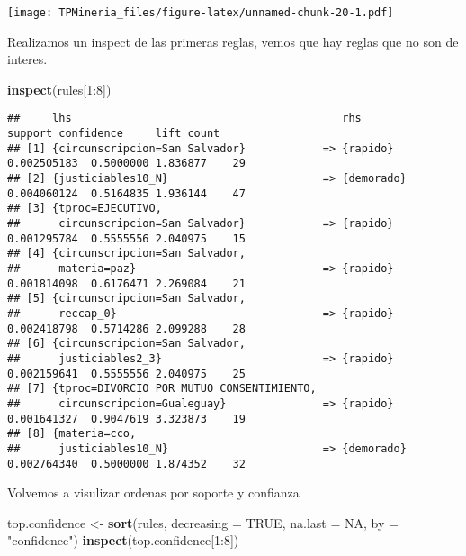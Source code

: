 \documentclass[runningheads,a4paper]{llncs}
\newenvironment{Shaded}{}{}
\newcommand{\KeywordTok}[1]{\textcolor[rgb]{0.00,0.44,0.13}{\textbf{{#1}}}}
\newcommand{\DataTypeTok}[1]{\textcolor[rgb]{0.56,0.13,0.00}{{#1}}}
\newcommand{\DecValTok}[1]{\textcolor[rgb]{0.25,0.63,0.44}{{#1}}}
\newcommand{\StringTok}[1]{\textcolor[rgb]{0.25,0.44,0.63}{{#1}}}
\newcommand{\OtherTok}[1]{\textcolor[rgb]{0.00,0.44,0.13}{{#1}}}
\newcommand{\NormalTok}[1]{{#1}}
\newcommand{\OperatorTok}[1]{\textcolor[rgb]{0.40,0.40,0.40}{{#1}}}
\begin{document}
\texttt{[image: TPMineria\_files/figure-latex/unnamed-chunk-20-1.pdf]}

Realizamos un inspect de las primeras reglas, vemos que hay reglas que
no son de interes.

\begin{Shaded}
\begin{Highlighting}[]
\KeywordTok{inspect}\NormalTok{(rules[}\DecValTok{1}\OperatorTok{:}\DecValTok{8}\NormalTok{])}
\end{Highlighting}
\end{Shaded}

\begin{verbatim}
##     lhs                                          rhs            support confidence     lift count
## [1] {circunscripcion=San Salvador}            => {rapido}   0.002505183  0.5000000 1.836877    29
## [2] {justiciables10_N}                        => {demorado} 0.004060124  0.5164835 1.936144    47
## [3] {tproc=EJECUTIVO,                                                                            
##      circunscripcion=San Salvador}            => {rapido}   0.001295784  0.5555556 2.040975    15
## [4] {circunscripcion=San Salvador,                                                               
##      materia=paz}                             => {rapido}   0.001814098  0.6176471 2.269084    21
## [5] {circunscripcion=San Salvador,                                                               
##      reccap_0}                                => {rapido}   0.002418798  0.5714286 2.099288    28
## [6] {circunscripcion=San Salvador,                                                               
##      justiciables2_3}                         => {rapido}   0.002159641  0.5555556 2.040975    25
## [7] {tproc=DIVORCIO POR MUTUO CONSENTIMIENTO,                                                    
##      circunscripcion=Gualeguay}               => {rapido}   0.001641327  0.9047619 3.323873    19
## [8] {materia=cco,                                                                                
##      justiciables10_N}                        => {demorado} 0.002764340  0.5000000 1.874352    32
\end{verbatim}

Volvemos a visulizar ordenas por soporte y confianza

\begin{Shaded}
\begin{Highlighting}[]
\NormalTok{top.confidence <-}\StringTok{ }\KeywordTok{sort}\NormalTok{(rules, }\DataTypeTok{decreasing =} \OtherTok{TRUE}\NormalTok{, }\DataTypeTok{na.last =} \OtherTok{NA}\NormalTok{, }\DataTypeTok{by =} \StringTok{"confidence"}\NormalTok{)}
\KeywordTok{inspect}\NormalTok{(top.confidence[}\DecValTok{1}\OperatorTok{:}\DecValTok{8}\NormalTok{])}
\end{Highlighting}
\end{Shaded}
\end{document}
